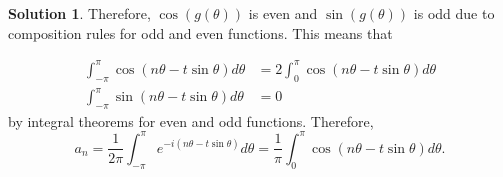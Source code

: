\documentclass[12pt]{article}
\theoremstyle{definition}
\newtheorem{sol}{Solution}
\theoremstyle{remark}
\begin{document}
\begin{sol}
Therefore, $\cos(g(\theta))$ is even and $\sin(g(\theta))$ is odd due to composition rules for odd and even functions. This means that

\begin{align}
    \int_{-\pi}^\pi \cos ( n\theta - t\sin\theta )d\theta &= 2 \int_{0}^\pi \cos ( n\theta - t\sin\theta )d\theta \\
    \int_{-\pi}^{\pi} \sin( n\theta - t\sin\theta ) d\theta &=  0
\end{align}
by integral theorems for even and odd functions. Therefore,
\begin{equation}
    a_n = \frac{1}{2\pi} \int_{-\pi}^\pi e^{-i(n\theta - t\sin\theta)}d\theta = \frac{1}{\pi} \int_{0}^\pi \cos ( n\theta - t\sin\theta )d\theta.
\end{equation}
\end{sol}
\end{document}
